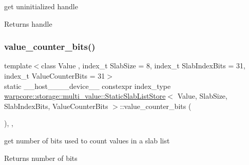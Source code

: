 get uninitialized handle 

\begin{DoxyReturn}{Returns}
handle 
\end{DoxyReturn}
\mbox{\label{classwarpcore_1_1storage_1_1multi__value_1_1StaticSlabListStore_a2b1e5bb9b69d35c4730f720ecc4549c9}} 
\subsubsection{\texorpdfstring{value\+\_\+counter\+\_\+bits()}{value\_counter\_bits()}}
{\footnotesize\ttfamily template$<$class Value , index\+\_\+t Slab\+Size = 8, index\+\_\+t Slab\+Index\+Bits = 31, index\+\_\+t Value\+Counter\+Bits = 31$>$ \\
static \+\_\+\+\_\+host\+\_\+\+\_\+\+\_\+\+\_\+device\+\_\+\+\_\+ constexpr index\+\_\+type \hyperlink{classwarpcore_1_1storage_1_1multi__value_1_1StaticSlabListStore}{warpcore\+::storage\+::multi\+\_\+value\+::\+Static\+Slab\+List\+Store}$<$ Value, Slab\+Size, Slab\+Index\+Bits, Value\+Counter\+Bits $>$\+::value\+\_\+counter\+\_\+bits (\begin{DoxyParamCaption}{ }\end{DoxyParamCaption})\hspace{0.3cm}{\ttfamily [inline]}, {\ttfamily [static]}, {\ttfamily [noexcept]}}



get number of bits used to count values in a slab list 

\begin{DoxyReturn}{Returns}
number of bits 
\end{DoxyReturn}
